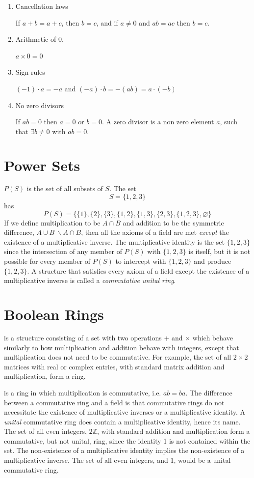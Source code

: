 \documentclass[10pt]{book}
\newcommand{\newthought}[1]{\vspace{0.5\baselineskip}\noindent{\scshape #1}}
\begin{document}
\begin{enumerate}
  \item Cancellation laws

    If $a+b=a+c$, then $b=c$, and if $a \ne 0$ and $ab=ac$ then $b=c$.

  \item Arithmetic of 0.

    $a \times 0 = 0$
  \item Sign rules

    $(-1)\cdot a = -a$ and $(-a)\cdot b = -(ab) = a \cdot (-b)$

  \item No zero divisors

    If $ab=0$ then $a=0$ or $b=0$. A zero divisor is a non zero element $a$, such that $\exists b \ne 0$ with $ab=0$.
\end{enumerate}

\section{Power Sets}
\newthought{A power set} $P(S)$ is the set of all subsets of $S$. The set
\[S=\{1,2,3\}\]
has
\[P(S)=\{ \{1\}, \{2\}, \{3\}, \{1,2\}, \{1,3\}, \{2,3\}, \{1,2,3\}, \varnothing \} \]
If we define multiplication to be $A \cap  B$ and addition to be the symmetric difference, $A \cup B\ \backslash A \cap B$,
then all the axioms of a field are met \emph{except} the existence of a multiplicative inverse. The multiplicative identity
is the set $\{1,2,3\}$ since the intersection of any member of $P(S)$ with $\{1,2,3\}$ is itself, but it is not possible for
every member of $P(S)$ to intercept with $\{1,2,3\}$ and produce $\{1,2,3\}$. A structure that satisfies every axiom of a
field except the existence of a multiplicative inverse is called a \emph{commutative unital ring}.

\section{Boolean Rings}
\newthought{A ring} is a structure consisting of a set with two operations $+$ and $\times$ which behave similarly to how
multiplication and addition behave with integers, except that multiplication does not need to be commutative. For example,
the set of all $2 \times 2$ matrices with real or complex entries, with standard matrix addition and multiplication,
form a ring.

\newthought{A commutative ring} is a ring in which multiplication is commutative, i.e. $ab=ba$. The difference between a
commutative ring and a field is that commutative rings do not necessitate the existence of multiplicative inverses or
a multiplicative identity. A \emph{unital} commutative ring does contain a multiplicative identity, hence its name.
The set of all even integers, $2\mathbb{Z}$, with standard addition and multiplication form a commutative, but not unital,
ring, since the identity 1 is not contained within the set. The non-existence of a multiplicative identity implies the
non-existence of a multiplicative inverse. The set of all even integers, and 1, would be a unital commutative ring.
\end{document}
